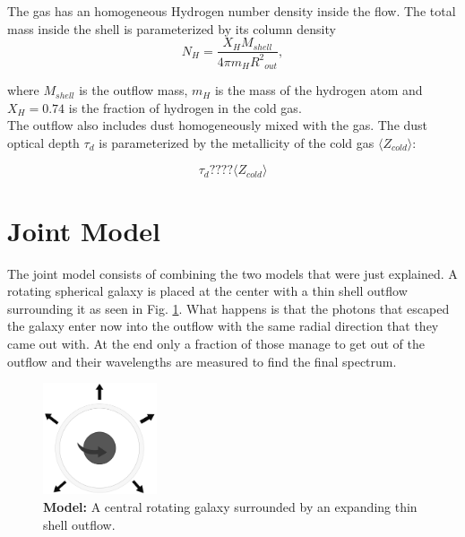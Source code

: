 The gas has an homogeneous Hydrogen number density inside the flow. The total mass inside the shell is parameterized by its column density\\

\begin{equation}
	\label{eq:nh}
	N_H = \frac{X_H M_{shell}}{4\pi m_H {R^2}_{out}},
\end{equation}

where $M_{shell}$ is the outflow mass, $m_H$ is the mass of the hydrogen atom and $X_H=0.74$ is the fraction of hydrogen in the cold gas.\\

The outflow also includes dust homogeneously mixed with the gas. The dust optical depth $\tau_d$ is parameterized by the metallicity of the cold gas $\langle Z_{cold} \rangle$: 

\begin{equation}
	\label{eq:z}
	\tau_{d} ???? \langle Z_{cold} \rangle
\end{equation}

\section{Joint Model}

The joint model consists of combining the two models that were just explained. A rotating spherical galaxy is placed at the center with a thin shell outflow surrounding it as seen in Fig. \ref{fig:model_app}. What happens is that the photons that escaped the galaxy enter now into the outflow with the same radial direction that they came out with. At the end only a fraction of those manage to get out of the outflow and their wavelengths are measured to find the final spectrum. \\

\begin{figure}[h!]
	\begin{center}
		\includegraphics[width=0.3\textwidth]{./figures/appendix/model.png}
	\end{center}
	\caption{\textbf{Model:} A central rotating galaxy surrounded by an expanding thin shell outflow.}
	\label{fig:model_app}
\end{figure}

